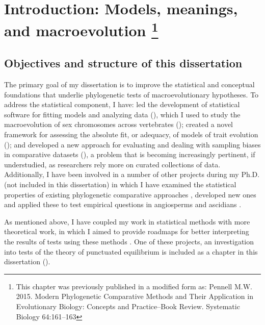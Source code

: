 \chapter[Introduction: Models, meanings, and macroevolution]{Introduction: Models, meanings, and macroevolution \footnote {This chapter was previously published in a modified form as: Pennell M.W. 2015. Modern Phylogenetic Comparative Methods and Their Application in Evolutionary Biology: Concepts and Practice--Book Review. Systematic Biology 64:161--163}}
\label{chap:introduction}

\section{Objectives and structure of this dissertation}

The primary goal of my dissertation is to improve the statistical and conceptual foundations that underlie phylogenetic tests of macroevolutionary hypotheses. To address the statistical component, I have: led the development of statistical software for fitting models and analyzing data (), which I used to study the macroevolution of sex chromosomes across vertebrates (); created a novel framework for assessing the  absolute fit, or adequacy, of models of trait evolution (); and developed a new approach for evaluating and dealing with sampling biases in comparative datasets (), a problem that is becoming increasingly pertinent, if understudied, as researchers rely more on curated collections of data. Additionally, I have been involved in a number of other projects during my Ph.D. (not included in this dissertation) in which I have examined the statistical properties of existing phylogenetic comparative approaches \citep{Pennell2012, UyedaPCA, Sarverprior}, developed new ones \citep{SlaterPennell, ksi} and applied these to test empirical questions in angiosperms \citep{ksi, nestedradiations} and ascidians \citep{Maliska2013}.

As mentioned above, I have coupled my work in statistical methods with more theoretical work, in which I aimed to provide roadmaps for better interpreting the results of tests using these methods \citep{Rosenblum2012, PennellHarmon, PennellPE, PennellTREEresponse, Pennellpcmbook}. One of these projects, an investigation into tests of the theory of punctuated equilibrium \citep{Eldredge1971, EldredgeGould1972} is included as a chapter in this dissertation (). 

